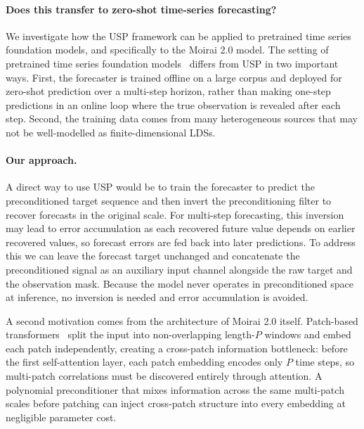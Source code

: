 \documentclass{article}
\begin{document}
\paragraph{Does this transfer to zero-shot time-series forecasting?} We investigate how the USP framework can be applied to pretrained time series foundation models, and specifically to the Moirai 2.0 model. The setting of pretrained time series foundation models~\citep{woo2024unified,liu2024moirai2,das2024decoder,ansari2024chronos,goswami2024moment,auer2025tirex} differs from USP in two important ways. First, the forecaster is trained offline on a large corpus and deployed for zero-shot prediction over a multi-step horizon, rather than making one-step predictions in an online loop where the true observation is revealed after each step. Second, the training data comes from many heterogeneous sources that may not be well-modelled as finite-dimensional LDSs.

\paragraph{Our approach.}
A direct way to use USP would be to train the forecaster to predict the preconditioned target sequence and
then invert the preconditioning filter to recover forecasts in the original scale. For multi-step
forecasting, this inversion may lead to error accumulation as each recovered future value depends on earlier recovered
values, so forecast errors are fed back into later predictions. To address this we can leave the forecast target unchanged and concatenate the preconditioned signal as an auxiliary input channel alongside the raw target and the observation mask. Because the model never operates in preconditioned space at inference, no inversion is needed and error accumulation is avoided.

A second motivation comes from the architecture of Moirai 2.0 itself. Patch-based transformers~\citep{nie2023patchtst,dosovitskiy2021image} split the input into non-overlapping length-$P$ windows and embed each patch independently, creating a cross-patch information bottleneck: before the first self-attention layer, each patch embedding encodes only $P$ time steps, so multi-patch correlations must be discovered entirely through attention. A polynomial preconditioner that mixes information across the same multi-patch scales before patching can inject cross-patch structure into every embedding at negligible parameter cost.
\end{document}
